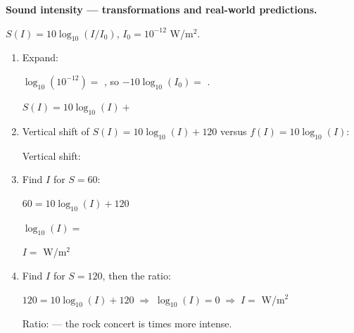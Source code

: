 \documentclass[10pt]{article}
\begin{document}
\begin{tcolorbox}[colback=white, colframe=black!40,
    title=\textbf{Tier E --- Extension},
    fonttitle=\bfseries, arc=2mm, left=3mm, right=3mm, top=2mm, bottom=2mm]

\textbf{Sound intensity --- transformations and real-world predictions.}

\vspace{4pt}
$S(I) = 10\log_{10}(I/I_0)$, $I_0 = 10^{-12}$ W/m$^2$.

\begin{enumerate}[leftmargin=1.8em, itemsep=10pt]

\item Expand:

\vspace{4pt}
$\log_{10}(10^{-12}) = $ , so $-10\log_{10}(I_0) = $ .

\vspace{4pt}
$S(I) = 10\log_{10}(I) + $ 

\item Vertical shift of $S(I) = 10\log_{10}(I) + 120$ versus $f(I) = 10\log_{10}(I)$:

\vspace{4pt}
Vertical shift: 

\item Find $I$ for $S = 60$:

\vspace{4pt}
$60 = 10\log_{10}(I) + 120$

\vspace{4pt}
$\log_{10}(I) = $ 

\vspace{4pt}
$I = $  W/m$^2$

\item Find $I$ for $S = 120$, then the ratio:

\vspace{4pt}
$120 = 10\log_{10}(I) + 120 \;\Rightarrow\; \log_{10}(I) = 0 \;\Rightarrow\; I = $  W/m$^2$

\vspace{4pt}
Ratio:  --- the rock concert is  times more intense.

\end{enumerate}
\end{tcolorbox}
\end{document}
